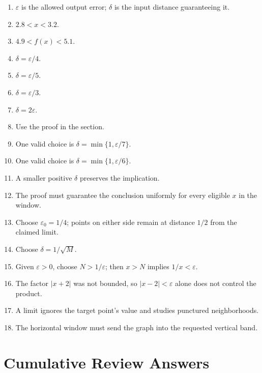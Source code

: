\documentclass[11pt,openany]{book}
\theoremstyle{bgplain}
\newcommand{\eps}{\varepsilon}
\begin{document}
\begin{enumerate}[label=\textbf{6.\arabic*}]
  \item \(\eps\) is the allowed output error; \(\delta\) is the input distance guaranteeing it.
  \item \(2.8<x<3.2\).
  \item \(4.9<f(x)<5.1\).
  \item \(\delta=\eps/4\).
  \item \(\delta=\eps/5\).
  \item \(\delta=\eps/3\).
  \item \(\delta=2\eps\).
  \item Use the proof in the section.
  \item One valid choice is \(\delta=\min\{1,\eps/7\}\).
  \item One valid choice is \(\delta=\min\{1,\eps/6\}\).
  \item A smaller positive \(\delta\) preserves the implication.
  \item The proof must guarantee the conclusion uniformly for every eligible \(x\) in the window.
  \item Choose \(\eps_0=1/4\); points on either side remain at distance \(1/2\) from the claimed limit.
  \item Choose \(\delta=1/\sqrt M\).
  \item Given \(\eps>0\), choose \(N>1/\eps\); then \(x>N\) implies \(1/x<\eps\).
  \item The factor \(|x+2|\) was not bounded, so \(|x-2|<\eps\) alone does not control the product.
  \item A limit ignores the target point's value and studies punctured neighborhoods.
  \item The horizontal window must send the graph into the requested vertical band.
\end{enumerate}

\section{Cumulative Review Answers}
\end{document}
